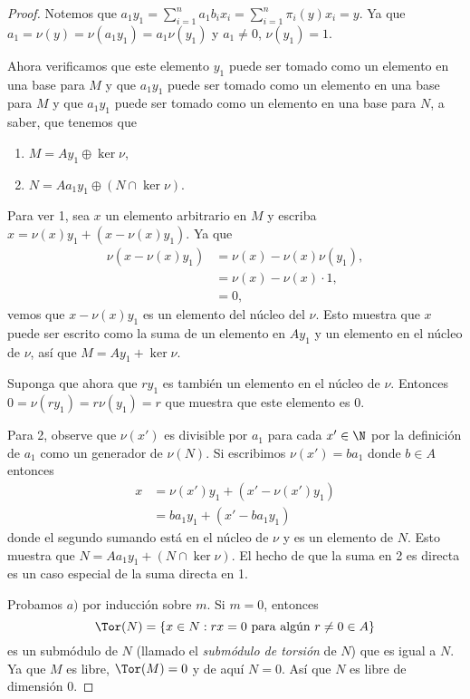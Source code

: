 \begin{proof}
  Notemos que $a_1 y_1 = \sum_{i=1}^n a_1 b_i x_i = \sum_{i=1}^n \pi_i (y) x_i = y$. Ya que $a_1 = \nu(y) = \nu(a_1 y_1) = a_1 \nu(y_1)$ y $a_1 \neq 0$, $\nu(y_1) = 1$.

  Ahora verificamos que este elemento $y_1$ puede ser tomado como un elemento en una base para $M$ y que $a_1 y_1$ puede ser tomado como un elemento en una base para $M$ y que $a_1 y_1$ puede ser tomado como un elemento en una base para $N$, a saber, que tenemos que
  \begin{enumerate}
    \item $M = Ay_1 \oplus \ker \nu$,
    \item $N = Aa_1y_1 \oplus (N \cap \ker \nu)$.
  \end{enumerate}
  Para ver 1, sea $x$ un elemento arbitrario en $M$ y escriba $x = \nu(x)y_1 + (x-\nu(x)y_1)$. Ya que
  \begin{align*}
    \nu(x-\nu(x)y_1) &= \nu(x) - \nu(x)\nu(y_1), \\
      &= \nu(x) - \nu(x)\cdot 1, \\
      &= 0,
  \end{align*}
  vemos que $x - \nu(x)y_1$ es un elemento del núcleo del $\nu$. Esto muestra que $x$ puede ser escrito como la suma de un elemento en $Ay_1$ y un elemento en el núcleo de $\nu$, así que $M = Ay_1 + \ker \nu$.

  Suponga que ahora que $ry_1$ es también un elemento en el núcleo de $\nu$. Entonces $0 = \nu(ry_1) = r\nu(y_1) = r$ que muestra que este elemento es $0$.

  Para 2, observe que $\nu(x')$ es divisible por $a_1$ para cada $x' \in \N$ por la definición de $a_1$ como un generador de $\nu(N)$. Si escribimos $\nu(x') = ba_1$ donde $b \in A$ entonces
  \begin{align*}
    x &= \nu(x')y_1 + (x' - \nu(x')y_1) \\
      &= ba_1y_1 + (x' - ba_1y_1)
  \end{align*}
  donde el segundo sumando está en el núcleo de $\nu$ y es un elemento de $N$. Esto muestra que $N = Aa_1y_1 + (N \cap \ker \nu)$. El hecho de que la suma en 2 es directa es un caso especial de la suma directa en 1.

  Probamos $a)$ por inducción sobre $m$. Si $m=0$, entonces 
  \[
    \Tor(N) = \{x \in N : rx = 0 \ \text{para algún}\ r \neq 0 \in A\}
  \]
  es un submódulo de $N$ (llamado el \emph{submódulo de torsión} de $N$) que es igual a $N$. Ya que $M$ es libre, $\Tor(M) = 0$ y de aquí $N=0$. Así que $N$ es libre de dimensión $0$.


\end{proof}
